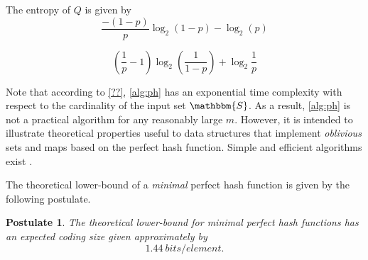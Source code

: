 \documentclass[hidelinks,11pt,final]{article}
\newcommand{\envnumstyle}{section}
\theoremstyle{plain}
\newtheorem{postulate}{Postulate}[\envnumstyle]
\begin{document}
The entropy of $Q$ is given by
\begin{equation}
    \frac{-(1-p)}{p} \log_2(1 - p) - \log_2(p)
\end{equation}

\begin{equation}
    \left(\frac{1}{p}-1\right) \log_2\!\left(\frac{1}{1 - p}\right) + \log_2\frac{1}{p}
\end{equation}


Note that according to \cref{??}, \cref{alg:ph} has an exponential time 
complexity with respect to the cardinality of the input set $\mathbbm{S}$. As a 
result, \cref{alg:ph} is not a practical algorithm for any reasonably large 
$m$. However, it is intended to illustrate theoretical properties useful to 
data structures that implement \emph{oblivious} sets and maps\cite{phf,pmf} 
based on the perfect hash function. Simple and efficient algorithms exist 
\cite{chd,simple}. 

The theoretical lower-bound of a \emph{minimal} perfect hash function is given by the following postulate.
\begin{postulate}
\label{pst:lb}
The theoretical lower-bound for \emph{minimal} perfect hash functions has an expected coding size given approximately by
\begin{equation}
\label{eq:low_bound}
    \SI{1.44}{bits \per element}.
\end{equation}
\end{postulate}
\end{document}

